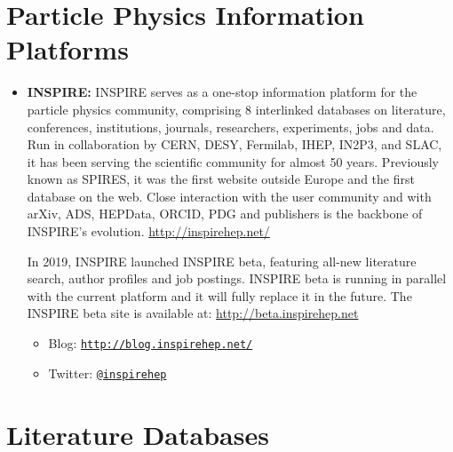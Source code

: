 \section{Particle Physics Information
Platforms}\label{databases:sec:platforms}

\begin{itemize}
\item
  \textbf{INSPIRE:} INSPIRE serves as a one-stop information platform
  for the particle physics community, comprising 8 interlinked databases
  on literature, conferences, institutions, journals, researchers,
  experiments, jobs and data. Run in collaboration by CERN, DESY,
  Fermilab, IHEP, IN2P3, and SLAC, it has been serving the scientific
  community for almost 50 years. Previously known as SPIRES, it was the
  first website outside Europe and the first database on the web. Close
  interaction with the user community and with arXiv, ADS, HEPData,
  ORCID, PDG and publishers is the backbone of INSPIRE's evolution.
  \url{http://inspirehep.net/}

  In 2019, INSPIRE launched INSPIRE beta, featuring all-new literature
  search, author profiles and job postings. INSPIRE beta is running in
  parallel with the current platform and it will fully replace it in the
  future. The INSPIRE beta site is available at:
  \url{http://beta.inspirehep.net}

  \begin{itemize}
  \tightlist
  \item
    Blog:
    \href{http://blog.inspirehep.net/}{\texttt{http://blog.inspirehep.net/}}
  \item
    Twitter: \href{https://twitter.com/inspirehep}{\texttt{@inspirehep}}
  \end{itemize}
\end{itemize}

\section{Literature Databases}\label{databases:sec:literature}


